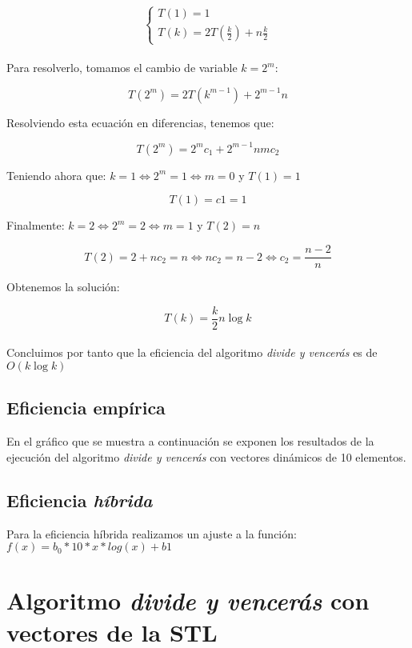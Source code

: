 \documentclass[11pt]{article}
\begin{document}
$$ \begin{cases} T(1) = 1\\ T(k) = 2T\left(\frac{k}{2}\right) + n\frac{k}{2} \end{cases} $$\\

Para resolverlo, tomamos el cambio de variable $ k = 2^m $:

$$ T(2^m) = 2T(k^{m-1}) + 2^{m-1}n $$

Resolviendo esta ecuación en diferencias, tenemos que:

$$ T(2^m) = 2^mc_1 + 2^{m-1}nm c_2 $$

Teniendo ahora que: $k = 1 \iff 2^m = 1 \iff m = 0$ y $T(1) = 1$

$$ T(1) = c1 = 1 $$

Finalmente: $k = 2 \iff 2^m = 2 \iff m = 1$ y $T(2) = n$

$$ T(2) = 2 + n c_2 = n \iff n c_2 = n - 2 \iff c_2 = \frac{n-2}{n}$$

Obtenemos la solución:

$$T(k) = \frac{k}{2}n\log k$$\\

Concluimos por tanto que la eficiencia del algoritmo \textit{divide y vencerás} es de $O(k\log k)$

\subsection*{Eficiencia empírica}

En el gráfico que se muestra a continuación se exponen los resultados de la
ejecución del algoritmo \textit{divide y vencerás} con vectores dinámicos de 10 elementos.
 \enlargethispage{5\baselineskip}
\begin{center}
	
\end{center}

\subsection*{Eficiencia \textit{híbrida}}
Para la eficiencia híbrida realizamos un ajuste a la función: $f(x) = b_0*10*x*log(x) + b1$
\begin{center}
	
\end{center}

\section*{Algoritmo \textit{divide y vencerás} con vectores de la STL}
\end{document}
